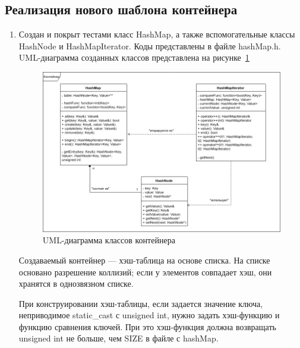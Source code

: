 \documentclass[a4paper, 14pt]{extarticle}
\begin{document}
\subsection{Реализация нового шаблона контейнера}
\begin{enumerate}
    \item Создан и покрыт тестами класс HashMap, а также вспомогательные классы HashNode и HashMapIterator. Коды представлены в файле hashMap.h.
    UML-диаграмма созданных классов представлена на рисунке~\ref{img:uml:container}
    \begin{figure}[h]
        \centering
        \includegraphics[width=\textwidth]{./img/container_classes_uml.png}
        \caption{UML-диаграмма классов контейнера}%
        \label{img:uml:container}
    \end{figure}
    
    Создаваемый контейнер --- хэш-таблица на основе списка. На списке основано разрешение коллизий; если у элементов совпадает хэш, они хранятся в однозвязном списке.

    При конструировании хэш-таблицы, если задается значение ключа, неприводимое static\_cast с unsigned int, нужно задать хэш-функцию и функцию сравнения ключей. При это хэш-функция должна возвращать unsigned int не больше, чем SIZE в файле с hashMap.


\end{enumerate}
\end{document}
